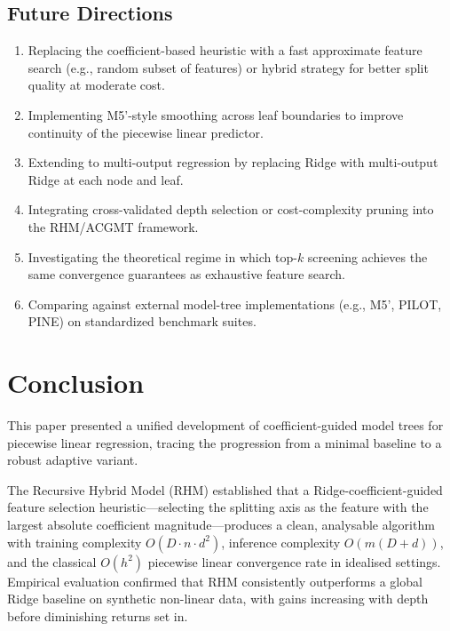 \documentclass[11pt,a4paper]{article}
\begin{document}
\subsection{Future Directions}

\begin{enumerate}
    \item[(a)] Replacing the coefficient-based heuristic with a fast approximate feature search (e.g., random subset of features) or hybrid strategy for better split quality at moderate cost.
    \item[(b)] Implementing M5'-style smoothing across leaf boundaries to improve continuity of the piecewise linear predictor.
    \item[(c)] Extending to multi-output regression by replacing Ridge with multi-output Ridge at each node and leaf.
    \item[(d)] Integrating cross-validated depth selection or cost-complexity pruning into the RHM/ACGMT framework.
    \item[(e)] Investigating the theoretical regime in which top-$k$ screening achieves the same convergence guarantees as exhaustive feature search.
    \item[(f)] Comparing against external model-tree implementations (e.g., M5', PILOT, PINE) on standardized benchmark suites.
\end{enumerate}

\section{Conclusion}\label{sec:conclusion}

This paper presented a unified development of coefficient-guided model trees for piecewise linear regression, tracing the progression from a minimal baseline to a robust adaptive variant.

The Recursive Hybrid Model (RHM) established that a Ridge-coefficient-guided feature selection heuristic---selecting the splitting axis as the feature with the largest absolute coefficient magnitude---produces a clean, analysable algorithm with training complexity $O(D \cdot n \cdot d^2)$, inference complexity $O(m(D+d))$, and the classical $O(h^2)$ piecewise linear convergence rate in idealised settings. Empirical evaluation confirmed that RHM consistently outperforms a global Ridge baseline on synthetic non-linear data, with gains increasing with depth before diminishing returns set in.
\end{document}
